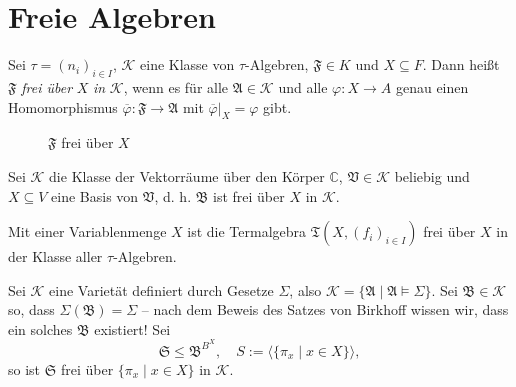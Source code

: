 \section{Freie Algebren}

\begin{definition}
Sei $ \tau = (n_i)_{i \in I}$, $\mathcal{K}$ eine Klasse von $\tau$-Algebren, $\mathfrak{F} \in K$ und $X \subseteq F$. Dann heißt $\mathfrak{F}$ \emph{frei über} $X$ \emph{in} $\mathcal{K}$, wenn es für alle $\mathfrak{A} \in \mathcal{K}$ und alle $\varphi : X \to A$ genau einen Homomorphismus $\overline{\varphi} : \mathfrak{F} \to \mathfrak{A}$ mit $\overline{\varphi} \vert_X = \varphi$ gibt.

\begin{figure}[H]
    \centering
    \caption{$\mathfrak{F}$ frei über $X$}
\end{figure}
\end{definition}

\begin{example}
    Sei $\mathcal{K}$ die Klasse der Vektorräume über den Körper $\mathbb{C}$, $\mathfrak{V} \in \mathcal{K}$ beliebig und $X \subseteq V$ eine Basis von $\mathfrak{V}$, d. h. $\mathfrak{B}$ ist frei über $X$ in $\mathcal{K}$.

    Mit einer Variablenmenge $X$ ist die Termalgebra $\mathfrak{T}(X, (f_i)_{i \in I})$ frei über $X$ in der Klasse aller $\tau$-Algebren.
\end{example}

\begin{example}
    Sei $\mathcal{K}$ eine Varietät definiert durch Gesetze $\Sigma$, also $\mathcal{K} = \{ \mathfrak{A} \mid \mathfrak{A} \models \Sigma \}$. Sei $\mathfrak{B} \in \mathcal{K}$ so, dass $\Sigma(\mathfrak{B}) = \Sigma$ -- nach dem Beweis des Satzes von Birkhoff wissen wir, dass ein solches $\mathfrak{B}$ existiert! Sei
    $$ \mathfrak{S} \leq \mathfrak{B}^{B^X}, \quad S := \langle \{ \pi_x \mid x \in X \} \rangle, $$
    so ist $\mathfrak{S}$ frei über $\{ \pi_x \mid x \in X \}$ in $\mathcal{K}$.
\end{example}

